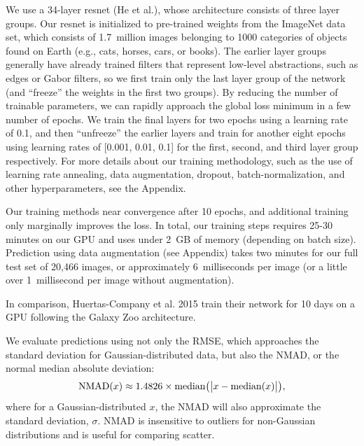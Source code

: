 \documentclass[fleqn,usenatbib]{mnras}
\begin{document}
We use a 34-layer resnet (He et al.), whose architecture consists of three layer groups.
Our resnet is initialized to pre-trained weights from the ImageNet data set, which consists of 1.7~million images belonging to 1000 categories of objects found on Earth (e.g., cats, horses, cars, or books).
The earlier layer groups generally have already trained filters that represent low-level abstractions, such as edges or Gabor filters, so we first train only the last layer group of the network (and ``freeze'' the weights in the first two groups).
By reducing the number of trainable parameters, we can rapidly approach the global loss minimum in a few number of epochs.
We train the final layers for two epochs using a learning rate of 0.1, and then ``unfreeze'' the earlier layers and train for another eight epochs using learning rates of [0.001, 0.01, 0.1] for the first, second, and third layer group respectively.
For more details about our training methodology, such as the use of learning rate annealing, data augmentation, dropout, batch-normalization, and other hyperparameters, see the Appendix.

Our training methods near convergence after 10 epochs, and additional training only marginally improves the loss.
In total, our training steps requires 25-30 minutes on our GPU and uses under 2~GB of memory (depending on batch size).
Prediction using data augmentation (see Appendix) takes two minutes for our full test set of 20,466 images, or approximately 6~milliseconds per image (or a little over 1~millisecond per image without augmentation).






In comparison, Huertas-Company et al. 2015 train their network for 10 days on a GPU following the Galaxy Zoo architecture.


We evaluate predictions using not only the RMSE, which approaches the standard deviation for Gaussian-distributed data, but also the NMAD, or the normal median absolute deviation:
\begin{equation}
{\rm NMAD}(x) \approx 1.4826 \times {\rm median} \big (\big|x - {\rm median }(x) \big|\big ),
\end{equation}
where for a Gaussian-distributed $x$, the NMAD will also approximate the standard deviation, $\sigma$.
NMAD is insensitive to outliers for non-Gaussian distributions and is useful for comparing scatter.
\end{document}
